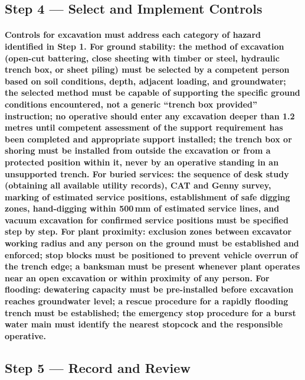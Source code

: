 \subsection{Step 4 --- Select and Implement Controls}
\paragraph{Controls for excavation must address each category of hazard identified in Step 1. For ground stability: the method of excavation (open-cut battering, close sheeting with timber or steel, hydraulic trench box, or sheet piling) must be selected by a competent person based on soil conditions, depth, adjacent loading, and groundwater; the selected method must be capable of supporting the specific ground conditions encountered, not a generic ``trench box provided'' instruction; no operative should enter any excavation deeper than 1.2 metres until competent assessment of the support requirement has been completed and appropriate support installed; the trench box or shoring must be installed from outside the excavation or from a protected position within it, never by an operative standing in an unsupported trench. For buried services: the sequence of desk study (obtaining all available utility records), CAT and Genny survey, marking of estimated service positions, establishment of safe digging zones, hand-digging within 500\,mm of estimated service lines, and vacuum excavation for confirmed service positions must be specified step by step. For plant proximity: exclusion zones between excavator working radius and any person on the ground must be established and enforced; stop blocks must be positioned to prevent vehicle overrun of the trench edge; a banksman must be present whenever plant operates near an open excavation or within proximity of any person. For flooding: dewatering capacity must be pre-installed before excavation reaches groundwater level; a rescue procedure for a rapidly flooding trench must be established; the emergency stop procedure for a burst water main must identify the nearest stopcock and the responsible operative.}

\subsection{Step 5 --- Record and Review}
